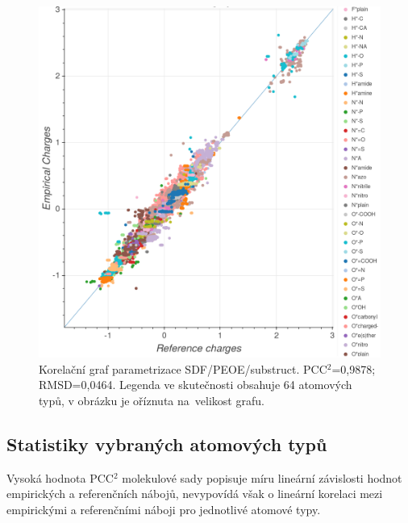 \begin{figure}[]
\begin{center}
\includegraphics[width=14cm]{pictures/graph_PEOE_substruct.png}
\caption{Korelační graf parametrizace SDF/PEOE/substruct.  PCC$^2$=0,9878; RMSD=0,0464. Legenda ve skutečnosti obsahuje 64 atomových typů, v obrázku je oříznuta na~velikost grafu.}
\label{graph_corr_PEOE}
\end{center}
\end{figure}

\subsection{Statistiky vybraných atomových typů}
Vysoká hodnota PCC$^2$ molekulové sady popisuje míru lineární závislosti hodnot empirických a referenčních nábojů, nevypovídá však o lineární korelaci mezi empirickými a referenčními náboji pro jednotlivé atomové typy.

